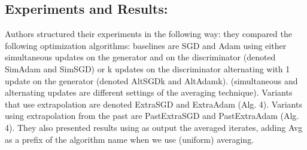 \documentclass[11pt]{article}
\begin{document}
	\subsection{Experiments and Results:}
	Authors structured their experiments in the following way: they compared the following optimization algorithms: baselines are SGD and Adam using either simultaneous updates on the generator and on the discriminator (denoted SimAdam and SimSGD) or k updates on the discriminator alternating with 1 update on the generator (denoted AltSGD{k} and AltAdam{k}). (simultaneous and alternating updates are different settings of the averaging technique). Variants that use extrapolation are denoted ExtraSGD and ExtraAdam (Alg. 4). Variants using extrapolation from the past are PastExtraSGD and PastExtraAdam (Alg. 4). They also presented results using as output the averaged iterates, adding Avg as a prefix of the algorithm name when we use (uniform) averaging.
\end{document}
